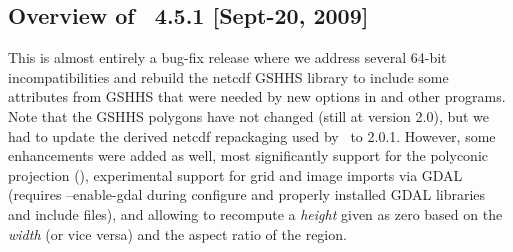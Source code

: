 \subsection{Overview of \gmt\ 4.5.1 [Sept-20, 2009]}

This is almost entirely a bug-fix release where we address several 64-bit incompatibilities and
rebuild the netcdf GSHHS library to include some attributes from GSHHS that were needed
by new options in  and other programs.  Note that the GSHHS polygons have not changed (still
at version 2.0), but we had to update the derived netcdf repackaging used by \GMT\ to 2.0.1.
However, some enhancements were added as well, most significantly support for the polyconic
projection (), experimental support for grid and image imports via GDAL
(requires --enable-gdal during configure and properly installed GDAL libraries and include files),
and allowing  to recompute a {\it height} given as zero based on the
{\it width} (or vice versa) and the aspect ratio of the region.

